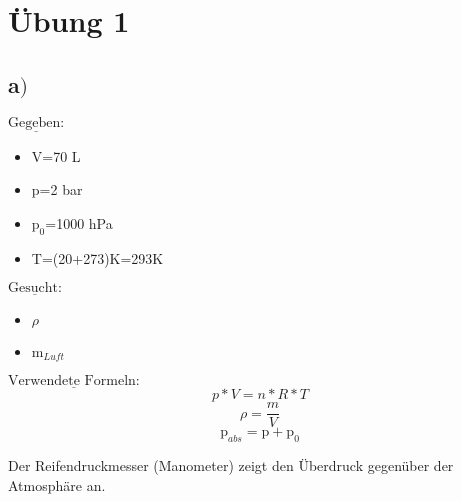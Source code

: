 \section{Übung 1}
\subsection*{a$)$}

\begin{minipage}[t]{0.33\textwidth}
$\underline{\text{Gegeben:}}$
\begin{itemize}
	\item V=70 \si{\liter}
	\item p=2 \si{\bar}
	\item $\text{p}_0$=1000 \si{\hecto\pascal}
	\item T=(20+273)\si{\kelvin}=293\si{\kelvin}
\end{itemize}
\end{minipage}
\begin{minipage}[t]{0.33\textwidth}
	$\underline{\text{Gesucht:}}$
	\begin{itemize}
		\item $\rho$
		\item m$_{Luft}$
	\end{itemize}
\end{minipage}
\begin{minipage}[t]{0.33\textwidth}
	$\underline{\text{Verwendete Formeln:}}$
	\begin{equation}
	p*V=n*R*T
	\end{equation}
	\begin{equation}
	\rho =\frac{m}{V}
	\end{equation}
	\begin{equation}
	\text{p}_{abs} =\text{p}+\text{p}_0
	\end{equation}
\end{minipage}

\vspace{1cm}

Der Reifendruckmesser (Manometer) zeigt den Überdruck gegenüber der Atmosphäre an.

